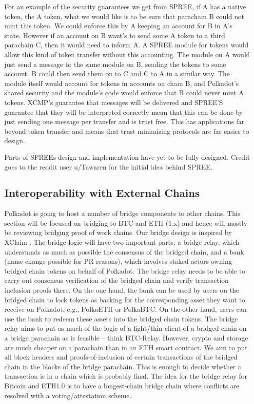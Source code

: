 \documentclass{article}
\begin{document}
\begin{appendix}
For an example of the security guarantees we get from SPREE, if A has a native token, the A token, what we would like is to be sure that parachain B could not mint this token. We could enforce this by A keeping an account for B in A's state. However if an account on B want's to send some A token to a third parachain C, then it would need to inform A. A SPREE module for tokens would allow this kind of token transfer without this accounting. The module on A would just send a message to the same module on B, sending the tokens to some account. B could then send them on to C and C to A in a similar way. The module itself would account for tokens in accounts on chain B, and Polkadot's shared security and the module's code would enforce that B could never mint A tokens. XCMP's guarantee that messages will be delivered and SPREE'S guarantee that they will be interpreted correctly mean that this can be done by just sending one message per transfer and is trust free. This has applications far beyond token transfer and means that trust minimising protocols are far easier to design.

Parts of SPREEs design and implementation have yet to be fully designed. Credit goes to the reddit user u/Tawaren for the initial idea behind SPREE.

\subsection{Interoperability with External Chains}\label{sec:bridge}

Polkadot is going to host a number of bridge components to other chains. This section will be focused on bridging to BTC and ETH (1.x) and hence will mostly be reviewing bridging proof of work chains. Our bridge design is inspired by XClaim \cite{Zamyatin:2019:XClaim}.
The bridge logic will have two important parts: a bridge relay, which understands as much as possible the consensus of the bridged chain, and a bank (name change possible for PR reasons), which involves staked actors owning bridged chain tokens on behalf of Polkadot.
The bridge relay needs to be able to carry out consensus verification of the bridged chain and verify transaction inclusion proofs there. On the one hand, the bank can be used by users on the bridged chain to lock tokens as backing for the corresponding asset they want to receive on Polkadot, e.g., PolkaETH or PolkaBTC. On the other hand, users can use the bank to redeem these assets into the bridged chain tokens.
The bridge relay aims to put as much of the logic of a light/thin client of a bridged chain on a bridge parachain as is feasible – think BTC-Relay. However, crypto and storage are much cheaper on a parachain than in an ETH smart contract. We aim to put all block headers and proofs-of-inclusion of certain transactions of the bridged chain in the blocks of the bridge parachain. This is enough to decide whether a transaction is in a chain which is probably final. The idea for the bridge relay for Bitcoin and ETH1.0 is to have a longest-chain bridge chain where conflicts are resolved with a voting/attestation scheme.


\end{appendix}
\end{document}
